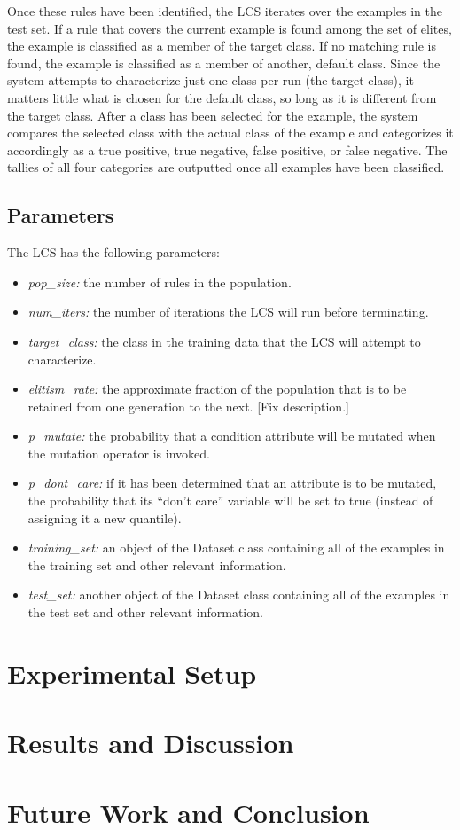 \documentclass[11pt]{article}
\begin{document}
Once these rules have been identified, the LCS iterates over the examples in the test set. If a rule that covers the current example is found among the set of elites, the example is classified as a member of the target class. If no matching rule is found, the example is classified as a member of another, default class. Since the system attempts to characterize just one class per run (the target class), it matters little what is chosen for the default class, so long as it is different from the target class. After a class has been selected for the example, the system compares the selected class with the actual class of the example and categorizes it accordingly as a true positive, true negative, false positive, or false negative. The tallies of all four categories are outputted once all examples have been classified.

\subsection{Parameters}

The LCS has the following parameters:

\begin{itemize}
\item \textit{pop\_size:} the number of rules in the population.
\item \textit{num\_iters:} the number of iterations the LCS will run before terminating.
\item \textit{target\_class:} the class in the training data that the LCS will attempt to characterize.
\item \textit{elitism\_rate:} the approximate fraction of the population that is to be retained from one generation to the next. [Fix description.]
\item \textit{p\_mutate:} the probability that a condition attribute will be mutated when the mutation operator is invoked.
\item \textit{p\_dont\_care:} if it has been determined that an attribute is to be mutated, the probability that its ``don't care'' variable will be set to true (instead of assigning it a new quantile).
\item \textit{training\_set:} an object of the Dataset class containing all of the examples in the training set and other relevant information.
\item \textit{test\_set:} another object of the Dataset class containing all of the examples in the test set and other relevant information.
\end{itemize}
\section{Experimental Setup}
\section{Results and Discussion}
\section{Future Work and Conclusion}
\end{document}
